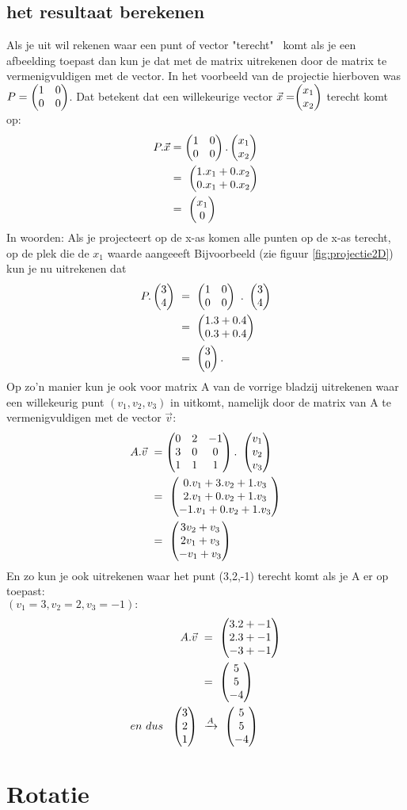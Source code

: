 \subsection{het resultaat berekenen}
Als je uit wil rekenen waar een punt of vector "terecht" \ komt als je een afbeelding toepast dan kun je dat met de matrix uitrekenen door de matrix te vermenigvuldigen met de vector. In het voorbeeld van de projectie hierboven was $ P = \begin{pmatrix} 1&0 \\ 0&0 \end{pmatrix} $. Dat betekent dat een willekeurige vector $ \vec{x} =  \vectweesnel{x} $  terecht komt op: 
\begin{align*}
P.\vec{x} 
&= \begin{pmatrix} 1&0 \\ 0&0 \end{pmatrix}   .
\begin{pmatrix} x_1 \\ x_2 \end{pmatrix} \\
&= \ \begin{pmatrix} 1.x_1 + 0.x_2 \\ 0.x_1 + 0.x_2 \end{pmatrix}  \\
& = \ \begin{pmatrix} x_1 \\ 0 \end{pmatrix}  
\end{align*}
In woorden: Als je projecteert op de x-as komen alle punten  op de x-as terecht, op de plek die de $ x_1 $ waarde aangeeeft Bijvoorbeeld (zie figuur \ref{fig:projectie2D}) kun je nu uitrekenen dat
\begin{align*}
P . \mattwee{3}{4}  \ 
&= \ \mattwee{1&0}{0&0}  \ . \   \mattwee{3}{4}  \\
&=  \ \mattwee{1.3 + 0.4}{0.3 + 0.4} \\
&= \ \mattwee{3}{0}.  
\end{align*}
Op zo'n manier kun je ook voor  matrix A van de vorrige bladzij uitrekenen waar een willekeurig punt $ (v_1, v_2, v_3)  $ in \RD uitkomt, namelijk door de matrix van A te vermenigvuldigen met de vector $ \vec{v} $:
\begin{align*}
A.\vec{v} \ 
&= \matdrie{0&2&-1}{3&0&0}{1&1&1}  
. \ \matdrie{v_1}{v_2}{v_3}   \\
&= \ \matdrie{0.v_1 + 3.v_2 + 1.v_3}{2.v_1 + 0.v_2+ 1.v_3}{-1.v_1 + 0.v_2 + 1.v_3}  \\
&= \ \matdrie{3v_2 + v_3}{2v_1 +  v_3}{-v_1 +  v_3} 
\end{align*}
En zo kun je ook  uitrekenen waar het punt (3,2,-1) terecht komt als je A er op toepast: \\
$ (v_1 = 3, v_2 = 2 ,  v_3=-1 ):  $ 
\begin{align*}
\quad \ A.\vec{v} \ 
&= \ \matdrie{3.2 + -1}{2.3+  -1}{-3 +  -1} \\
&= \  \matdrie{5}{5}{-4} \\
en \ dus \ \ 
\matdrie{3}{2}{1}  \ & \xrightarrow{A}  \   \matdrie{5}{5}{-4}
\end{align*}
\section{Rotatie}		
\label{rotatie}
